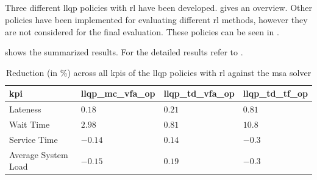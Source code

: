 \documentclass{seal_thesis}
\begin{document}
\subsection{}
\label{subsec:rl_llqp}

Three different \gls{llqp} policies with \gls{rl} have been developed.  gives an overview. Other policies have been implemented for evaluating different \gls{rl} methods, however they are not considered for the final evaluation. These policies can be seen in .

\begin{table}[!ht]
\centering
{}
\caption{Overview of developed \gls{llqp} policies with \gls{rl}}
\label{tab:rl_llqp_policies_overview}
\end{table}

 shows the summarized results. For the detailed results refer to .

\begin{table}[!ht]
\centering
\begin{tabular}{@{}llll@{}}
\toprule
\gls{kpi}                 & llqp\_mc\_vfa\_op & llqp\_td\_vfa\_op & llqp\_td\_tf\_op \\ \midrule
Lateness            & $0.18$                  & $0.21$                  & $0.81$                 \\
Wait Time           & $2.98$                  & $0.81$                  & $10.8$                 \\
Service Time        & $-0.14$                  & $0.14$                  & $-0.3$                 \\
Average System Load & $-0.15$                  & $0.19$                  & $-0.3$                 \\ \bottomrule
\end{tabular}
\caption{Reduction (in \%) across all \glspl{kpi} of the \gls{llqp} policies with \gls{rl} against the \gls{msa} solver}
\label{tab:rl_llqp_kpis_comp_gain}
\end{table}
\end{document}
